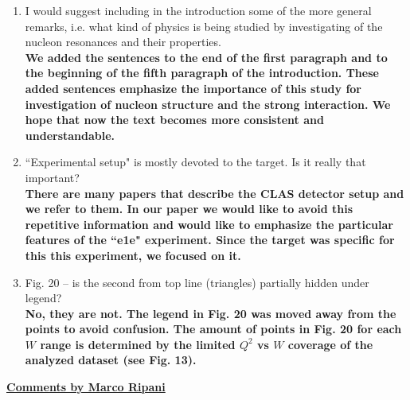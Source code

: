 \documentclass[,superscriptaddress,showpacs,amssymb,amsmath,amsfonts,linenumbers,article]{revtex4-1}
\begin{document}
\begin{enumerate}

\item I would suggest including in the introduction some of the more general remarks, i.e. what kind
of physics is being studied by investigating of the nucleon resonances and their properties.\\
{\bf We added the sentences to the end of the first paragraph and to the beginning of the fifth paragraph of the introduction. These added sentences emphasize the importance of this study for investigation of nucleon structure and the strong interaction. We hope that now the text becomes more consistent and understandable.}

\item ``Experimental setup" is mostly devoted to the target. Is it really that important?\\
{\bf There are many papers that describe the CLAS detector setup and we refer to them. In our paper we would like to avoid this repetitive information and would like to emphasize the particular features of the ``e1e" experiment. Since the target was specific for this this experiment, we focused on it.}

\item Fig. 20 -- is the second from top line (triangles) partially hidden under legend?\\
{\bf No, they are not. The legend in Fig. 20 was moved away from the points to avoid confusion. The amount of points in Fig. 20 for each $W$ range is determined by the limited $Q^{2}$ vs $W$ coverage of the analyzed dataset (see Fig. 13).}

\end{enumerate}




\vspace{1cm}
\underline{\bf Comments by Marco Ripani}\\[1cm]
\end{document}

